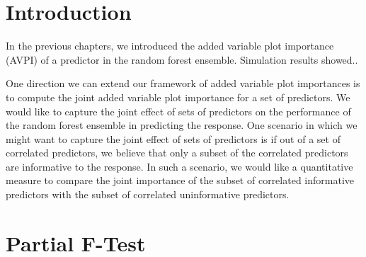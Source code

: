 \documentclass[12pt,twoside]{reedthesis}
\theoremstyle{definition}
\theoremstyle{definition}
\theoremstyle{definition}
\theoremstyle{remark}
\begin{document}
\section{Introduction}\label{introduction-4}

In the previous chapters, we introduced the added variable plot
importance (AVPI) of a predictor in the random forest ensemble.
Simulation results showed..

One direction we can extend our framework of added variable plot
importances is to compute the joint added variable plot importance for a
set of predictors. We would like to capture the joint effect of sets of
predictors on the performance of the random forest ensemble in
predicting the response. One scenario in which we might want to capture
the joint effect of sets of predictors is if out of a set of correlated
predictors, we believe that only a subset of the correlated predictors
are informative to the response. In such a scenario, we would like a
quantitative measure to compare the joint importance of the subset of
correlated informative predictors with the subset of correlated
uninformative predictors.

\section{Partial F-Test}\label{partial-f-test}
\end{document}
